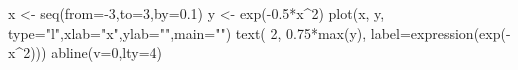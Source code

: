 \begin{Schunk}
\begin{Sinput}
 x <- seq(from=-3,to=3,by=0.1)
 y <- exp(-0.5*x^2)
 plot(x, y, type="l",xlab="x",ylab="",main="")
 text( 2, 0.75*max(y), label=expression(exp(-x^2)))
 abline(v=0,lty=4)
\end{Sinput}
\end{Schunk}
